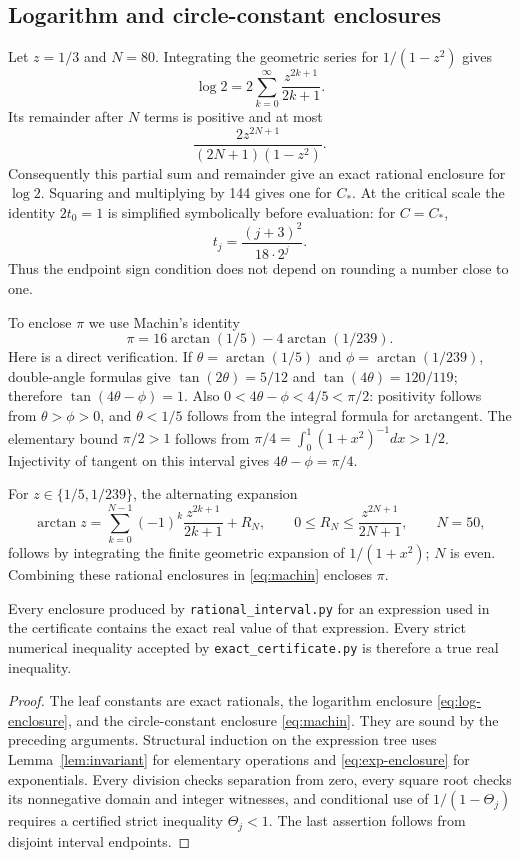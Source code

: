 \subsection{Logarithm and circle-constant enclosures}
Let $z=1/3$ and $N=80$. Integrating the geometric series for $1/(1-z^2)$
gives
\[
 \log2=2\sum_{k=0}^\infty\frac{z^{2k+1}}{2k+1}.
\]
Its remainder after $N$ terms is positive and at most
\begin{equation}\label{eq:log-enclosure}
 \frac{2z^{2N+1}}{(2N+1)(1-z^2)}.
\end{equation}
Consequently this partial sum and remainder give an exact rational enclosure
for $\log2$. Squaring and multiplying by 144 gives one for $C_*$.
At the critical scale the identity $2t_0=1$ is simplified symbolically
before evaluation: for $C=C_*$,
\[
 t_j=\frac{(j+3)^2}{18\cdot2^j}.
\]
Thus the endpoint sign condition does not depend on rounding a number close
to one.

To enclose $\pi$ we use Machin's identity
\begin{equation}\label{eq:machin}
 \pi=16\arctan(1/5)-4\arctan(1/239).
\end{equation}
Here is a direct verification. If $\theta=\arctan(1/5)$ and
$\phi=\arctan(1/239)$, double-angle formulas give
$\tan(2\theta)=5/12$ and $\tan(4\theta)=120/119$; therefore
$\tan(4\theta-\phi)=1$. Also $0<4\theta-\phi<4/5<\pi/2$:
positivity follows from $\theta>\phi>0$, and
$\theta<1/5$ follows from the integral formula for arctangent.
The elementary bound $\pi/2>1$ follows from
$\pi/4=\int_0^1(1+x^2)^{-1}dx>1/2$.
Injectivity of tangent on this interval gives $4\theta-\phi=\pi/4$.

For $z\in\{1/5,1/239\}$, the alternating expansion
\[
 \arctan z=\sum_{k=0}^{N-1}(-1)^k\frac{z^{2k+1}}{2k+1}+R_N,
 \qquad 0\le R_N\le\frac{z^{2N+1}}{2N+1},\qquad N=50,
\]
follows by integrating the finite geometric expansion of $1/(1+x^2)$;
$N$ is even. Combining these rational enclosures in \eqref{eq:machin}
encloses $\pi$.

\begin{lemma}\label{lem:soundness}
Every enclosure produced by \texttt{rational\_interval.py} for an expression
used in the certificate contains the exact real value of that expression.
Every strict numerical inequality accepted by \texttt{exact\_certificate.py}
is therefore a true real inequality.
\end{lemma}
\begin{proof}
The leaf constants are exact rationals, the logarithm enclosure
\eqref{eq:log-enclosure}, and the circle-constant enclosure
\eqref{eq:machin}. They are sound by the preceding arguments.
Structural induction on the expression tree uses Lemma~\ref{lem:invariant}
for elementary operations and \eqref{eq:exp-enclosure} for exponentials.
Every division checks separation from zero, every square root checks its
nonnegative domain and integer witnesses, and conditional use of
$1/(1-\Theta_j)$ requires a certified strict inequality $\Theta_j<1$.
The last assertion follows from disjoint interval endpoints.
\end{proof}


